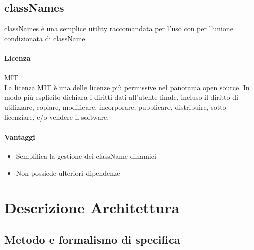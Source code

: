 \subsection{classNames}

classNames è una semplice utility raccomandata per l'uso con  per l'unione condizionata di className

\paragraph{Licenza} MIT \\
La licenza MIT è una delle licenze più permissive nel panorama open
source. In modo più esplicito dichiara i diritti dati all'utente
finale, incluso il diritto di utilizzare, copiare, modificare,
incorporare, pubblicare, distribuire, sotto-licenziare, e/o vendere il
software. 
\\

\paragraph{Vantaggi}
\begin{itemize}
	\item Semplifica la gestione dei className dinamici 
	\item Non possiede ulteriori dipendenze 
\end{itemize}


\section{Descrizione Architettura}
\subsection{Metodo e formalismo di specifica}

